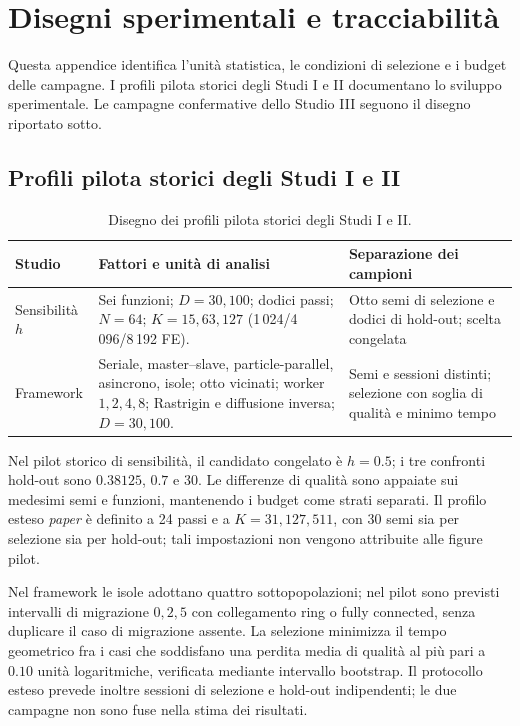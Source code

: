\section{Disegni sperimentali e tracciabilità}\label{app:campaigns}
Questa appendice identifica l'unità statistica, le condizioni di selezione e i budget delle campagne. I profili pilota storici degli Studi I e II documentano lo sviluppo sperimentale. Le campagne confermative dello Studio III seguono il disegno riportato sotto.

\subsection{Profili pilota storici degli Studi I e II}
\begin{table}[H]\centering\small
\caption{Disegno dei profili pilota storici degli Studi I e II.}\label{tab:campaigns}
\begin{tabularx}{\textwidth}{@{}p{2.6cm}X p{3.2cm}@{}}\toprule
Studio & Fattori e unità di analisi & Separazione dei campioni\\\midrule
Sensibilità $h$ & Sei funzioni; $D=30,100$; dodici passi; $N=64$; $K=15,63,127$ (1\,024/4\,096/8\,192 FE). & Otto semi di selezione e dodici di hold-out; scelta congelata\\
Framework & Seriale, master--slave, particle-parallel, asincrono, isole; otto vicinati; worker $1,2,4,8$; Rastrigin e diffusione inversa; $D=30,100$. & Semi e sessioni distinti; selezione con soglia di qualità e minimo tempo\\
\bottomrule\end{tabularx}
\end{table}

Nel pilot storico di sensibilità, il candidato congelato è $h=0.5$; i tre confronti hold-out sono $0.38125$, $0.7$ e $30$. Le differenze di qualità sono appaiate sui medesimi semi e funzioni, mantenendo i budget come strati separati. Il profilo esteso \emph{paper} è definito a 24 passi e a $K=31,127,511$, con 30 semi sia per selezione sia per hold-out; tali impostazioni non vengono attribuite alle figure pilot.

Nel framework le isole adottano quattro sottopopolazioni; nel pilot sono previsti intervalli di migrazione $0,2,5$ con collegamento ring o fully connected, senza duplicare il caso di migrazione assente. La selezione minimizza il tempo geometrico fra i casi che soddisfano una perdita media di qualità al più pari a $0.10$ unità logaritmiche, verificata mediante intervallo bootstrap. Il protocollo esteso prevede inoltre sessioni di selezione e hold-out indipendenti; le due campagne non sono fuse nella stima dei risultati.

